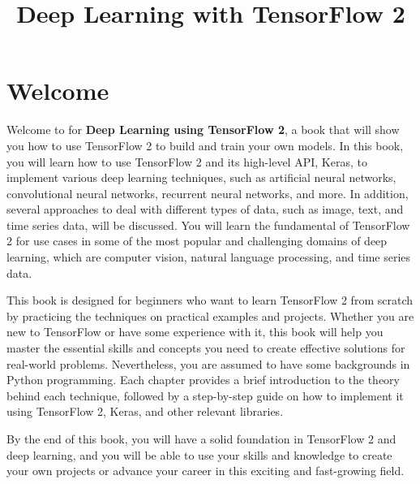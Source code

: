 \documentclass[
  letterpaper,
  DIV=11,
  numbers=noendperiod]{scrreprt}
\title{Deep Learning with TensorFlow 2}
\author{}
\date{}
\renewcommand*\contentsname{Table of contents}
\newcommand\contentsname{Table of contents}
\begin{document}
\maketitle
\ifdefined\Shaded\renewenvironment{Shaded}{\begin{tcolorbox}[boxrule=0pt, sharp corners, enhanced, breakable, borderline west={3pt}{0pt}{shadecolor}, frame hidden, interior hidden]}{\end{tcolorbox}}\fi

\renewcommand*\contentsname{Table of contents}
{
\hypersetup{linkcolor=}
\setcounter{tocdepth}{2}
\tableofcontents
}

\hypertarget{welcome}{%
\chapter*{Welcome}\label{welcome}}


Welcome to for \textbf{Deep Learning using TensorFlow 2}, a book that
will show you how to use TensorFlow 2 to build and train your own
models. In this book, you will learn how to use TensorFlow 2 and its
high-level API, Keras, to implement various deep learning techniques,
such as artificial neural networks, convolutional neural networks,
recurrent neural networks, and more. In addition, several approaches to
deal with different types of data, such as image, text, and time series
data, will be discussed. You will learn the fundamental of TensorFlow 2
for use cases in some of the most popular and challenging domains of
deep learning, which are computer vision, natural language processing,
and time series data.

This book is designed for beginners who want to learn TensorFlow 2 from
scratch by practicing the techniques on practical examples and projects.
Whether you are new to TensorFlow or have some experience with it, this
book will help you master the essential skills and concepts you need to
create effective solutions for real-world problems. Nevertheless, you
are assumed to have some backgrounds in Python programming. Each chapter
provides a brief introduction to the theory behind each technique,
followed by a step-by-step guide on how to implement it using TensorFlow
2, Keras, and other relevant libraries.

By the end of this book, you will have a solid foundation in TensorFlow
2 and deep learning, and you will be able to use your skills and
knowledge to create your own projects or advance your career in this
exciting and fast-growing field.
\end{document}
